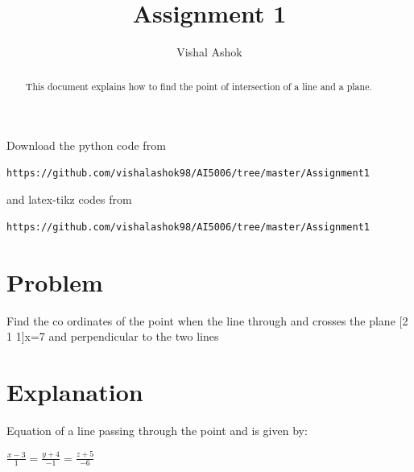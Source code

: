 \documentclass[journal,12pt,twocolumn]{IEEEtran}
\begin{document}
\renewcommand{\thefigure}{\theproblem}
\def\putbox#1#2#3{\makebox[0in][l]{\makebox[#1][l]{}\raisebox{\baselineskip}[0in][0in]{\raisebox{#2}[0in][0in]{#3}}}}
     \def\rightbox#1{\makebox[0in][r]{#1}}
     \def\centbox#1{\makebox[0in]{#1}}
     \def\topbox#1{\raisebox{-\baselineskip}[0in][0in]{#1}}
     \def\midbox#1{\raisebox{-0.5\baselineskip}[0in][0in]{#1}}
\vspace{3cm}
\title{Assignment 1}
\author{Vishal Ashok}
\maketitle
\newpage
\bigskip
\renewcommand{\thefigure}{\theenumi}
\renewcommand{\thetable}{\theenumi}
\begin{abstract}
This document explains how to find the point of intersection of a line and a plane.
\end{abstract}
Download the python code from 
%
\begin{lstlisting}
https://github.com/vishalashok98/AI5006/tree/master/Assignment1
\end{lstlisting}
%
and latex-tikz codes from 
%
\begin{lstlisting}
https://github.com/vishalashok98/AI5006/tree/master/Assignment1
\end{lstlisting}
%

\section{Problem}
Find the co ordinates of the point when the line through
 and  crosses the plane [2  1  1]x=7 and perpendicular to the two lines

	
	
\section{Explanation}
Equation of a line passing through the point  and  is given by:
\begin{center}

$\frac{x-3}{1} = \frac{y+4}{-1}= \frac{z+5}{-6}$ \label{eq:1}
\end{center}
\end{document}

